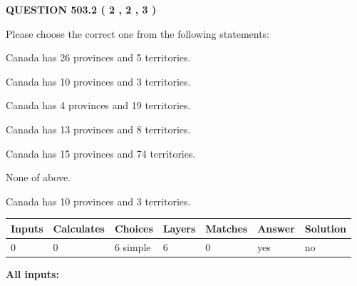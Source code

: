 \documentclass[12pt]{article}
\begin{document}
   
  
\vspace{0.2in}
  
{\textbf{\Large{QUESTION
503.2 
 ( 2 , 2 , 3 )
}}}
  
  
Please choose the correct one from the following statements:
 
 
Canada has  26 provinces and  5 territories.
 
 
Canada has 10  provinces and 3 territories.
 
 
Canada has   4 provinces and  19 territories.
 
 
Canada has  13 provinces and  8 territories.
 
 
Canada has  15 provinces and  74 territories.
 
 
 None of above.
 
 
\noindent{}
 
 
Canada has 10  provinces and 3 territories.
 
 
\noindent{}
 
 
   
   
   
   
\noindent\begin{tabular}{|l|l|l|l|l|l|l|}
 \hline
Inputs & Calculates & Choices & Layers & Matches & Answer & Solution \\ \hline
 0  & 
 0  & 
 6
  simple  
  & 
 6  & 
 0  & 
  yes & 
  no 
  \\ \hline
 \end{tabular}
   
   
   
   
\noindent{}
   
   
   
   
\noindent\vspace{0.1in}\hspace{-0.08in} {\textbf{\Large{All inputs: }}}
   
   
   
   
   
   
 \vspace{0.2in}
 
\end{document}
